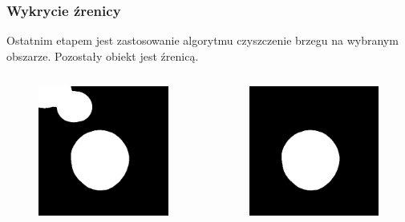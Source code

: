 \documentclass{beamer}
\begin{document}
\begin{frame}
\frametitle{Wykrycie źrenicy}
Ostatnim etapem jest zastosowanie algorytmu czyszczenie brzegu na wybranym obszarze. Pozostały obiekt jest źrenicą.
\begin{columns}
		\begin{figure}
		\begin{center}
		\includegraphics[scale=0.25]{roi1.jpg}
		\end{center}
		\end{figure}
		\begin{figure}
		\begin{center}
		\includegraphics[scale=0.25]{roi2.jpg}
		\end{center}
		\end{figure}
\end{columns}
\end{frame}
\end{document}
